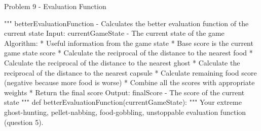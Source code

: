 \begin{problem}{Problem 9 - Evaluation Function}
    \begin{highlight}[Solution]
    \begin{code}[Python]
    """ betterEvaluationFunction - Calculates the better evaluation function of the current state
        Input:
            currentGameState - The current state of the game
        Algorithm:
          * Useful information from the game state
          * Base score is the current game state score
          * Calculate the reciprocal of the distance to the nearest food
          * Calculate the reciprocal of the distance to the nearest ghost
          * Calculate the reciprocal of the distance to the nearest capsule
          * Calculate remaining food score (negative because more food is worse)
          * Combine all the scores with appropriate weights
          * Return the final score
        Output:
            finalScore - The score of the current state
    """
    def betterEvaluationFunction(currentGameState):
        """
            Your extreme ghost-hunting, pellet-nabbing, food-gobbling, unstoppable
            evaluation function (question 5).
    

\end{code}
\end{highlight}
\end{problem}
